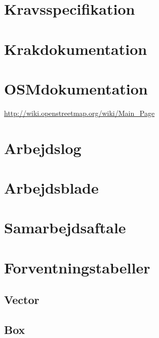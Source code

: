 \section{Kravsspecifikation}
\label{sec:Kravsspecifikation}


\section{Krakdokumentation}
\label{sec:Krakdokumentation}
\label{Introduction to the KRAK roadmap data and associated code}

\label{Dokumentation KDV}


\section{OSMdokumentation}
\url{http://wiki.openstreetmap.org/wiki/Main_Page}

\section{Arbejdslog}
\label{sec:Arbejdslog}


\section{Arbejdsblade}
\label{sec:Arbejdsblade}


\section{Samarbejdsaftale}
\label{sec:Samarbejdsaftale}



\section{Forventningstabeller}
\label{sec:forventningstabeller}
	\subsection{Vector}
	
	\clearpage

	\subsection{Box}
	
	\clearpage